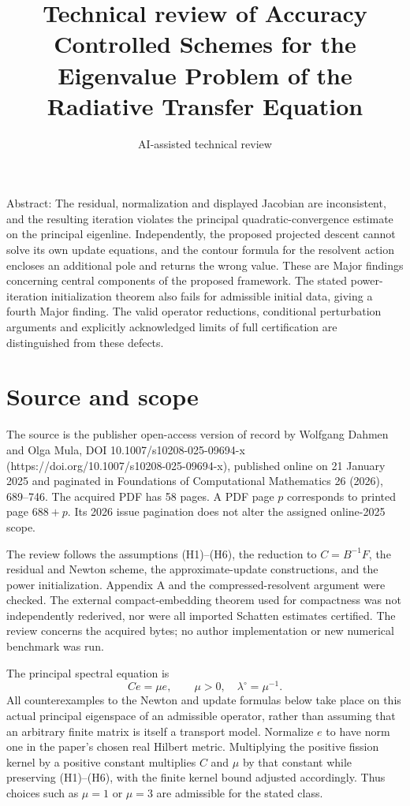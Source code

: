 \documentclass[10pt]{article}
\title{Technical review of
Accuracy Controlled Schemes for the Eigenvalue Problem of the Radiative Transfer Equation}
\author{AI-assisted technical review}
\date{}
\begin{document}
\maketitle
Abstract: The residual, normalization and displayed Jacobian are inconsistent, and the resulting iteration violates the principal quadratic-convergence estimate on the principal eigenline. Independently, the proposed projected descent cannot solve its own update equations, and the contour formula for the resolvent action encloses an additional pole and returns the wrong value. These are Major findings concerning central components of the proposed framework. The stated power-iteration initialization theorem also fails for admissible initial data, giving a fourth Major finding. The valid operator reductions, conditional perturbation arguments and explicitly acknowledged limits of full certification are distinguished from these defects.\par
\section*{Source and scope}
The source is the publisher open-access version of record by Wolfgang Dahmen and Olga Mula, DOI 10.1007/s10208-025-09694-x (https://doi.org/10.1007/s10208-025-09694-x), published online on 21 January 2025 and paginated in Foundations of Computational Mathematics 26 (2026), 689–746. The acquired PDF has 58 pages. A PDF page \(p\) corresponds to printed page \(688+p\). Its 2026 issue pagination does not alter the assigned online-2025 scope.\par
The review follows the assumptions (H1)–(H6), the reduction to \(C=B^{-1}F\), the residual and Newton scheme, the approximate-update constructions, and the power initialization. Appendix A and the compressed-resolvent argument were checked. The external compact-embedding theorem used for compactness was not independently rederived, nor were all imported Schatten estimates certified. The review concerns the acquired bytes; no author implementation or new numerical benchmark was run.\par
The principal spectral equation is \[Ce=\mu e,\qquad \mu>0,\quad \lambda^\circ=\mu^{-1}.\] All counterexamples to the Newton and update formulas below take place on this actual principal eigenspace of an admissible operator, rather than assuming that an arbitrary finite matrix is itself a transport model. Normalize \(e\) to have norm one in the paper’s chosen real Hilbert metric. Multiplying the positive fission kernel by a positive constant multiplies \(C\) and \(\mu\) by that constant while preserving (H1)–(H6), with the finite kernel bound adjusted accordingly. Thus choices such as \(\mu=1\) or \(\mu=3\) are admissible for the stated class.\par
\end{document}
